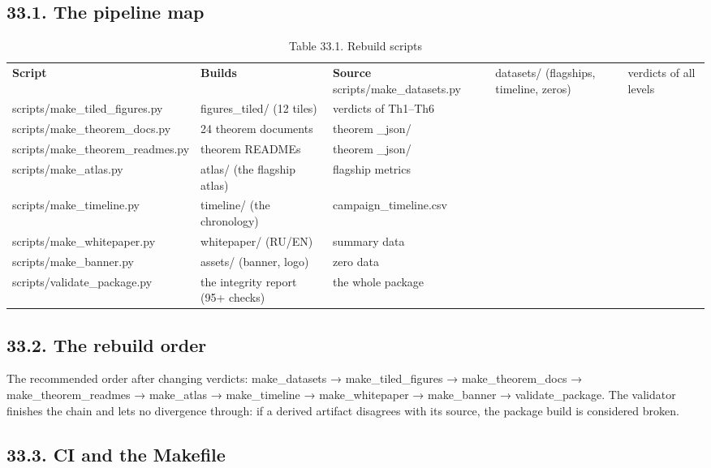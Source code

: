 \documentclass[11pt,a4paper]{article}
\begin{document}
\subsection{33.1. The pipeline map}

\begin{table}[htbp]\centering\small
\caption{Table 33.1. Rebuild scripts}
\begin{tabular}{p{} p{} p{}}
\toprule
\textbf{Script} & \textbf{Builds} & \textbf{Source}
\midrule
scripts/make\_datasets.py & datasets/ (flagships, timeline, zeros) & verdicts of all levels \\
scripts/make\_tiled\_figures.py & figures\_tiled/ (12 tiles) & verdicts of Th1–Th6 \\
scripts/make\_theorem\_docs.py & 24 theorem documents & theorem \_json/ \\
scripts/make\_theorem\_readmes.py & theorem READMEs & theorem \_json/ \\
scripts/make\_atlas.py & atlas/ (the flagship atlas) & flagship metrics \\
scripts/make\_timeline.py & timeline/ (the chronology) & campaign\_timeline.csv \\
scripts/make\_whitepaper.py & whitepaper/ (RU/EN) & summary data \\
scripts/make\_banner.py & assets/ (banner, logo) & zero data \\
scripts/validate\_package.py & the integrity report (95+ checks) & the whole package \\
\bottomrule
\end{tabular}
\end{table}

\subsection{33.2. The rebuild order}

The recommended order after changing verdicts: make\_datasets → make\_tiled\_figures → make\_theorem\_docs → make\_theorem\_readmes → make\_atlas → make\_timeline → make\_whitepaper → make\_banner → validate\_package. The validator finishes the chain and lets no divergence through: if a derived artifact disagrees with its source, the package build is considered broken.

\subsection{33.3. CI and the Makefile}
\end{document}
